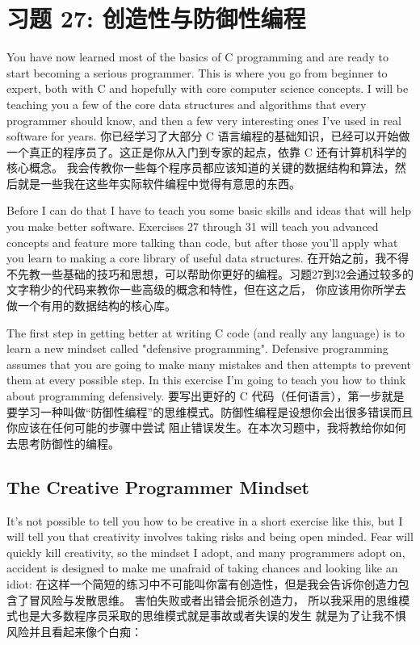 \chapter{习题 27: 创造性与防御性编程}

You have now learned most of the basics of C programming and are ready to start becoming a serious
programmer.  This is where you go from beginner to expert, both with C and hopefully with
core computer science concepts.  I will be teaching you a few of the core data structures and
algorithms that every programmer should know, and then a few very interesting ones I've used
in real software for years.
你已经学习了大部分 C 语言编程的基础知识，已经可以开始做一个真正的程序员了。这正是你从入门到专家的起点，依靠 C 还有计算机科学的核心概念。
我会传教你一些每个程序员都应该知道的关键的数据结构和算法，然后就是一些我在这些年实际软件编程中觉得有意思的东西。

Before I can do that I have to teach you some basic skills and ideas that will help you
make better software.  Exercises 27 through 31 will teach you advanced concepts and feature
more talking than code, but after those you'll apply what you learn to making a core library
of useful data structures.
在开始之前，我不得不先教一些基础的技巧和思想，可以帮助你更好的编程。习题27到32会通过较多的文字稍少的代码来教你一些高级的概念和特性，但在这之后，
你应该用你所学去做一个有用的数据结构的核心库。

The first step in getting better at writing C code (and really any language) is
to learn a new mindset called "defensive programming".  Defensive programming
assumes that you are going to make many mistakes and then attempts to prevent
them at every possible step.   In this exercise I'm going to teach you how 
to think about programming defensively.
要写出更好的 C 代码（任何语言），第一步就是要学习一种叫做“防御性编程”的思维模式。防御性编程是设想你会出很多错误而且你应该在任何可能的步骤中尝试
阻止错误发生。在本次习题中，我将教给你如何去思考防御性的编程。

\section{The Creative Programmer Mindset}

It's not possible to tell you how to be creative in a short exercise like this,
but I will tell you that creativity involves taking risks and being open minded.
Fear will quickly kill creativity, so the mindset I adopt, and many programmers
adopt on, accident is designed to make me unafraid of taking chances and 
looking like an idiot:
在这样一个简短的练习中不可能叫你富有创造性，但是我会告诉你创造力包含了冒风险与发散思维。
害怕失败或者出错会扼杀创造力， 所以我采用的思维模式也是大多数程序员采取的思维模式就是事故或者失误的发生
就是为了让我不惧风险并且看起来像个白痴：

